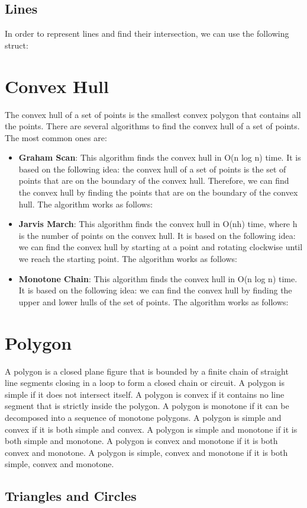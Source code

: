 


\subsection{Lines}

In order to represent lines and find their intersection, we can use the following struct:




\section{Convex Hull}

The convex hull of a set of points is the smallest convex polygon that contains all the points. There are several algorithms to find the convex hull of a set of points. The most common ones are:

\begin{itemize}
    \item \textbf{Graham Scan}: This algorithm finds the convex hull in O(n log n) time. It is based on the following idea: the convex hull of a set of points is the set of points that are on the boundary of the convex hull. Therefore, we can find the convex hull by finding the points that are on the boundary of the convex hull. The algorithm works as follows:
    
    \item \textbf{Jarvis March}: This algorithm finds the convex hull in O(nh) time, where h is the number of points on the convex hull. It is based on the following idea: we can find the convex hull by starting at a point and rotating clockwise until we reach the starting point. The algorithm works as follows:
    \item \textbf{Monotone Chain}: This algorithm finds the convex hull in O(n log n) time. It is based on the following idea: we can find the convex hull by finding the upper and lower hulls of the set of points. The algorithm works as follows:
    
\end{itemize}


\section{Polygon}

A polygon is a closed plane figure that is bounded by a finite chain of straight line segments closing in a loop to form a closed chain or circuit. A polygon is simple if it does not intersect itself. A polygon is convex if it contains no line segment that is strictly inside the polygon. A polygon is monotone if it can be decomposed into a sequence of monotone polygons. A polygon is simple and convex if it is both simple and convex. A polygon is simple and monotone if it is both simple and monotone. A polygon is convex and monotone if it is both convex and monotone. A polygon is simple, convex and monotone if it is both simple, convex and monotone.



\subsection{Triangles and Circles}




